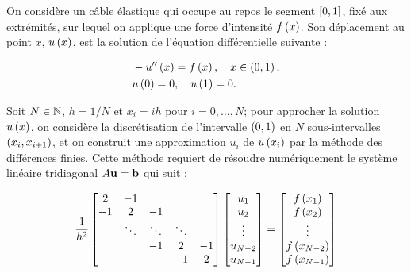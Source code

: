On considère un câble élastique qui occupe au repos le segment $\squared{0, 1}$, fixé aux extrémités, sur lequel on applique une force d'intensité $f \parent{x}$.
Son déplacement au point $x$, $u \parent{x}$, est la solution de l'équation différentielle suivante :

\begin{equation}
\label{eq:equadiff}  
  \begin{split}
      &  - u'' \parent{x} = f \parent{x}, \quad x \in \parent{0, 1}, \\
      &  u \parent{0} = 0, \quad u \parent{1} = 0.
  \end{split}
\end{equation}

Soit $N \in \N$, $h = 1/N$ et $x_{i} = ih$ pour $i = 0, \dots, N$; pour approcher la solution $u \parent{x}$, on considère la discrétisation de l'intervalle $\parent{0, 1}$ en $N$ sous-intervalles $\parent{x_{i}, x_{i+1}}$, et on construit une approximation $u_{i}$ de $u \parent{x_{i}}$ par la méthode des différences finies.
Cette méthode requiert de résoudre numériquement le système linéaire tridiagonal $A \BoldU = \BoldB$ qui suit :

\begin{equation}
\label{eq:systri}
  \dfrac{1}{h^{2}}
  \begin{bmatrix}
        2       &   -1    &             &         &     \\
       -1       &   2     &      -1     &         &     \\
                & \ddots  &   \ddots    &  \ddots &     \\
                &         &      -1     &     2   &  -1   \\
                &         &             &    -1   &   2
  \end{bmatrix}
  \begin{bmatrix}
    u_{1} \\
    u_{2} \\
    \vdots \\
    u_{N-2} \\
    u_{N-1} 
  \end{bmatrix}
  =
  \begin{bmatrix}
    f \parent{x_{1}} \\
    f \parent{x_{2}}  \\
    \vdots \\
    f \parent{x_{N-2}}  \\
    f \parent{x_{N-1}}  
  \end{bmatrix}
\end{equation}

